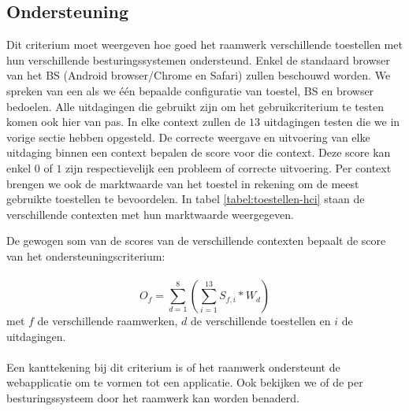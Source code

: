 \subsection{Ondersteuning}
\label{sec:vergelijking-ondersteuning}
Dit criterium moet weergeven hoe goed het raamwerk verschillende toestellen met hun verschillende besturingssystemen ondersteund.
Enkel de standaard browser van het BS (Android browser/Chrome en Safari) zullen beschouwd worden.
We spreken van een  als we één bepaalde configuratie van toestel, BS en browser bedoelen.
Alle uitdagingen die gebruikt zijn om het gebruikcriterium te testen komen ook hier van pas.
In elke context zullen de $13$ uitdagingen testen die we in vorige sectie hebben opgesteld.
De correcte weergave en uitvoering van elke uitdaging binnen een context bepalen de score voor die context.
Deze score kan enkel $0$ of $1$ zijn respectievelijk een probleem of correcte uitvoering.
Per context brengen we ook de marktwaarde van het toestel in rekening om de meest gebruikte toestellen te bevoordelen.
In tabel \ref{tabel:toestellen-hci} staan de verschillende contexten met hun marktwaarde weergegeven.

De gewogen som van de scores van de verschillende contexten bepaalt de score van het ondersteuningscriterium:
\paragraph{}
\begin{equation}
  O_f = \sum_{d=1}^{8}{\left(\sum_{i=1}^{13}S_{f,i}*W_d\right)}
  \label{eq:ondersteuning}
\end{equation}
met $f$ de verschillende raamwerken,  $d$ de verschillende toestellen en $i$ de uitdagingen. 
\paragraph{}
Een kanttekening bij dit criterium is of het raamwerk ondersteunt de webapplicatie om te vormen tot een  applicatie. 
Ook bekijken we of de  per besturingssysteem door het raamwerk kan worden benaderd.

